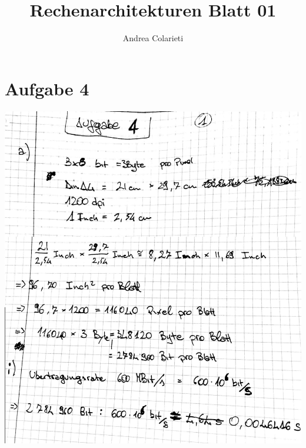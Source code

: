 \documentclass[10pt,a4paper]{article}
\author{Andrea Colarieti}
\title{Rechenarchitekturen Blatt 01}
\begin{document}
\section{Aufgabe 4}
\includegraphics[scale=0.25]{rech_t1u4_1.jpg} 
\end{document}
